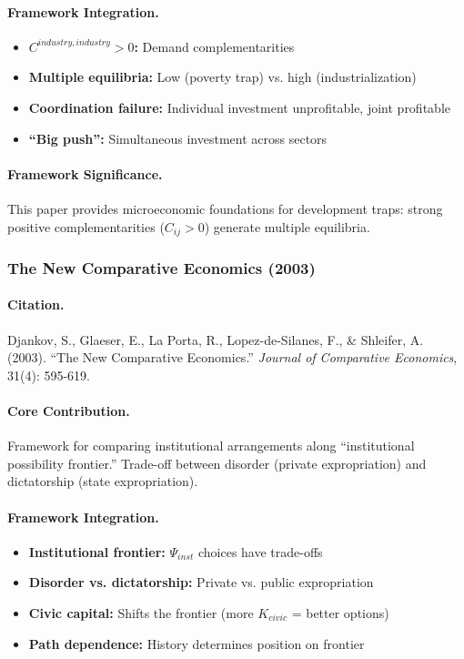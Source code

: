 \paragraph{Framework Integration.}
\begin{itemize}
  \item \textbf{$C^{industry,industry} > 0$:} Demand complementarities
  \item \textbf{Multiple equilibria:} Low (poverty trap) vs. high (industrialization)
  \item \textbf{Coordination failure:} Individual investment unprofitable, joint profitable
  \item \textbf{``Big push'':} Simultaneous investment across sectors
\end{itemize}

\paragraph{Framework Significance.}
This paper provides microeconomic foundations for development traps:
strong positive complementarities ($C_{ij} > 0$) generate multiple equilibria.

\subsubsection{The New Comparative Economics (2003)}

\paragraph{Citation.}
Djankov, S., Glaeser, E., La Porta, R., Lopez-de-Silanes, F., \& Shleifer, A. (2003).
``The New Comparative Economics.''
\emph{Journal of Comparative Economics}, 31(4): 595-619.

\paragraph{Core Contribution.}
Framework for comparing institutional arrangements along ``institutional
possibility frontier.'' Trade-off between disorder (private expropriation)
and dictatorship (state expropriation).

\paragraph{Framework Integration.}
\begin{itemize}
  \item \textbf{Institutional frontier:} $\Psi_{inst}$ choices have trade-offs
  \item \textbf{Disorder vs. dictatorship:} Private vs. public expropriation
  \item \textbf{Civic capital:} Shifts the frontier (more $K_{civic}$ = better options)
  \item \textbf{Path dependence:} History determines position on frontier
\end{itemize}

